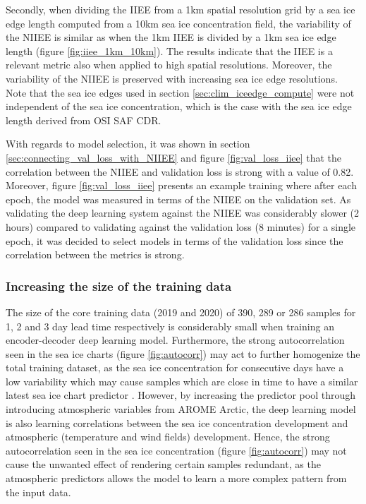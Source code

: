 \documentclass[../main/thesis]{subfiles}
\begin{document}
Secondly, when dividing the IIEE from a 1km spatial resolution grid by a sea ice edge length computed from a 10km sea ice concentration field, the variability of the NIIEE is similar as when the 1km IIEE is divided by a 1km sea ice edge length (figure \ref{fig:iiee_1km_10km}). The results indicate that the IIEE is a relevant metric also when applied to high spatial resolutions. Moreover, the variability of the NIIEE is preserved with increasing sea ice edge resolutions. Note that the sea ice edges used in section \ref{sec:clim_iceedge_compute} were not independent of the sea ice concentration, which is the case with the sea ice edge length derived from OSI SAF CDR.

With regards to model selection, it was shown in section \ref{sec:connecting_val_loss_with_NIIEE} and figure \ref{fig:val_loss_iiee} that the correlation between the NIIEE and validation loss is strong with a value of 0.82. Moreover, figure \ref{fig:val_loss_iiee} presents an example training where after each epoch, the model was measured in terms of the NIIEE on the validation set. As validating the deep learning system against the NIIEE was considerably slower (2 hours) compared to validating against the validation loss (8 minutes) for a single epoch, it was decided to select models in terms of the validation loss since the correlation between the metrics is strong.

\subsubsection{Increasing the size of the training data}
\label{sec:increase_data}
The size of the core training data (2019 and 2020) of 390, 289 or 286 samples for 1, 2 and 3 day lead time respectively is considerably small when training an encoder-decoder deep learning model. Furthermore, the strong autocorrelation seen in the sea ice charts (figure \ref{fig:autocorr}) may act to further homogenize the total training dataset, as the sea ice concentration for consecutive days have a low variability which may cause samples which are close in time to have a similar latest sea ice chart predictor \citep{Fritzner2020}. However, by increasing the predictor pool through introducing atmospheric variables from AROME Arctic, the deep learning model is also learning correlations between the sea ice concentration development and atmospheric (temperature and wind fields) development. Hence, the strong autocorrelation seen in the sea ice concentration (figure \ref{fig:autocorr}) may not cause the unwanted effect of rendering certain samples redundant, as the atmospheric predictors allows the model to learn a more complex pattern from the input data.
\end{document}
